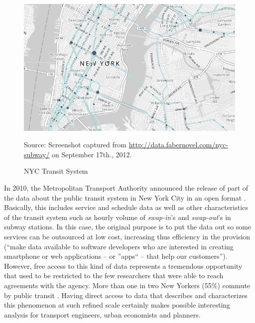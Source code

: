 \documentclass[12pt]{article}
\begin{document}
\begin{figure}[<+t+>]
   \begin{center}
       \includegraphics[width=1.0\textwidth]{nyc.png}
   \end{center}
   \begin{footnotesize}
       Source: Screenshot captured from
       \url{http://data.fabernovel.com/nyc-subway/} on September 17th., 2012.
   \end{footnotesize}
   \caption{NYC Transit System}
   \label{fig:nyc}
\end{figure}

In 2010, the Metropolitan Transport Authority
announced the release of part of the data about the public
transit system in New York City in an open format \citep{mtaopen}.
Basically, this includes service and schedule data as well as other
characteristics of the transit system such as hourly volume of \emph{swap-in}'s and
\emph{swap-out}'s in subway stations.
In this case, the original purpose is to put the data out so some services can
be outsourced at low cost, increasing thus efficiency in the provision (``make data available to software developers who
are interested in creating smartphone or web applications -- or ''apps`` --
that help our customers'').
However, free access to this kind of data represents a tremendous opportunity
that used to be restricted to the few researchers that were able to reach
agreements with the agency.
More than one in two New Yorkers (55\%) commute by public transit
\citep{acs2010-5year_est}. Having direct access to data that describes and
characterizes this phenomenon at such refined scale certainly makes possible 
interesting analysis for transport engineers, urban economists and planners.
\end{document}
